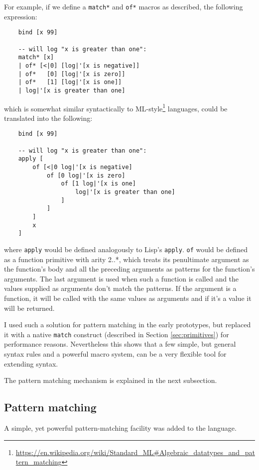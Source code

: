 For example, if we define a \texttt{match*} and \texttt{of*} macros as described, the following expression:
\begin{lstlisting}
    bind [x 99]
    
    -- will log "x is greater than one":
    match* [x]
    | of* [<|0] [log|'[x is negative]]
    | of*   [0] [log|'[x is zero]]
    | of*   [1] [log|'[x is one]]
    | log|'[x is greater than one]
\end{lstlisting}

which is somewhat similar syntactically to ML-style\footnote{\url{https://en.wikipedia.org/wiki/Standard_ML\#Algebraic_datatypes_and_pattern_matching}} languages, could be translated into the following:
\begin{lstlisting}
    bind [x 99]
    
    -- will log "x is greater than one":
    apply [
        of [<|0 log|'[x is negative] 
            of [0 log|'[x is zero]
                of [1 log|'[x is one]
                    log|'[x is greater than one]
                ]
            ]
        ]
        x
    ]
\end{lstlisting}

where \texttt{apply} would be defined analogously to Lisp's \texttt{apply}. \texttt{of} would be defined as a function primitive with arity 2..*, which treats its penultimate argument as the function's body and all the preceding arguments as patterns for the function's arguments. The last argument is used when such a function is called and the values supplied as arguments don't match the patterns. If the argument is a function, it will be called with the same values as arguments and if it's a value it will be returned.

I used such a solution for pattern matching in the early prototypes, but replaced it with a native \texttt{match} construct (described in Section \ref{sec:primitives}) for performance reasons. Nevertheless this shows that a few simple, but general syntax rules and a powerful macro system, can be a very flexible tool for extending syntax.

The pattern matching mechanism is explained in the next subsection.

\subsection{Pattern matching}
A simple, yet powerful pattern-matching facility was added to the language.

